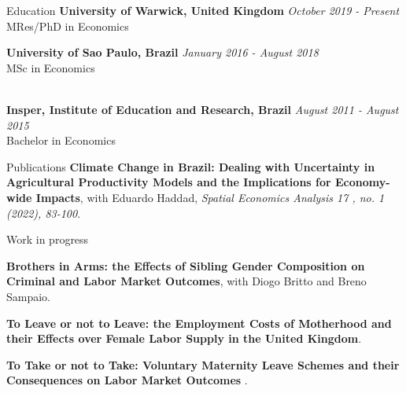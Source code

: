 \documentclass{resume} %
\begin{document}


\begin{rSection}{Education}
{\bf University of Warwick, United Kingdom } \hfill {\em October 2019 - Present} 
\\ MRes/PhD in Economics

{\bf University of Sao Paulo, Brazil } \hfill {\em January 2016 - August 2018} 
\\ MSc in Economics

\\{\bf Insper, Institute of Education and Research, Brazil} \hfill {\em August 2011 - August 2015} 
\\ Bachelor in Economics
\end{rSection}


\begin{rSection}{Publications}
\textbf{Climate Change in Brazil: Dealing with Uncertainty in Agricultural Productivity Models and the Implications for Economy-wide Impacts}, with Eduardo Haddad, \textit{Spatial Economics Analysis 17 , no. 1 (2022), 83-100}.

\end{rSection}

 
\begin{rSection}{Work in progress}

\textbf{Brothers in Arms: the Effects of Sibling Gender Composition on Criminal and Labor Market Outcomes}, with Diogo Britto and Breno Sampaio.

\textbf{To Leave or not to Leave: the Employment Costs of Motherhood and their Effects over Female Labor Supply in the United Kingdom}.

\textbf{To Take or not to Take: Voluntary Maternity Leave Schemes and their Consequences on Labor Market Outcomes }.


\end{rSection}
\end{document}
